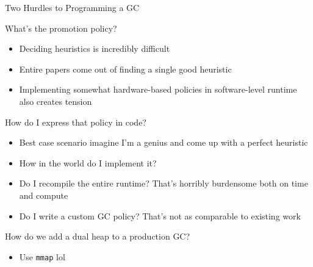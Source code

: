 \begin{frame}{Two Hurdles to Programming a GC}
  \begin{block}{What's the promotion policy?}
    \begin{itemize}[<+>]
      \item Deciding heuristics is incredibly difficult
      \item Entire papers come out of finding a single good heuristic
      \item Implementing somewhat hardware-based policies in software-level runtime also creates tension
    \end{itemize}
  \end{block}
  \begin{block}{How do I express that policy in code?}
    \begin{itemize}[<+>]
      \item Best case scenario imagine I'm a genius and come up with a perfect heuristic
      \item How in the world do I implement it?
      \item Do I recompile the entire runtime? That's horribly burdensome both on time and compute
      \item Do I write a custom GC policy? That's not as comparable to existing work
    \end{itemize}
  \end{block}
  \begin{block}{How do we add a dual heap to a production GC?}
    \begin{itemize}[<+>]
      \item Use \texttt{mmap} lol
    \end{itemize}
  \end{block}
\end{frame}

